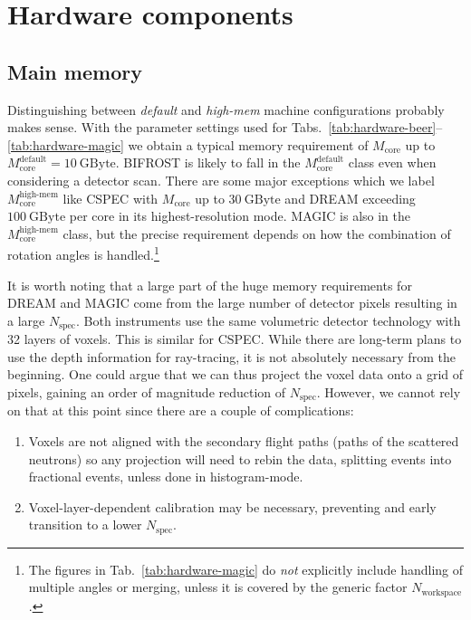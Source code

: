 \documentclass[a4paper,english,numbers=noenddot,bibliography=totoc,chapterprefix=on,DIV=12]{scrartcl}
\newcommand{\Nworkspace}{N_{\text{workspace}}}
\newcommand{\Nspec}{N_{\text{spec}}}
\newcommand{\Mcore}{M_{\text{core}}}
\newcommand{\bifrost}{BIFROST\xspace}
\newcommand{\cspec}{CSPEC\xspace}
\newcommand{\dream}{DREAM\xspace}
\newcommand{\magic}{MAGIC\xspace}
\begin{document}
\section{Hardware components}


\subsection{Main memory}

Distinguishing between \emph{default} and \emph{high-mem} machine configurations probably makes sense.
With the parameter settings used for Tabs.~\ref{tab:hardware-beer}--\ref{tab:hardware-magic} we obtain a typical memory requirement of $\Mcore$ up to $\Mcore^{\text{default}} = 10~\mathrm{GByte}$.
\bifrost is likely to fall in the $\Mcore^{\text{default}}$ class even when considering a detector scan.
There are some major exceptions which we label $\Mcore^{\text{high-mem}}$ like \cspec with $\Mcore$ up to $30~\mathrm{GByte}$ and \dream exceeding $100~\mathrm{GByte}$ per core in its highest-resolution mode.
\magic is also in the $\Mcore^{\text{high-mem}}$ class, but the precise requirement depends on how the combination of rotation angles is handled.\footnote{The figures in Tab.~\ref{tab:hardware-magic} do \emph{not} explicitly include handling of multiple angles or merging, unless it is covered by the generic factor $\Nworkspace$.}

It is worth noting that a large part of the huge memory requirements for \dream and \magic come from the large number of detector pixels resulting in a large $\Nspec$.
Both instruments use the same volumetric detector technology with 32 layers of voxels.
This is similar for \cspec.
While there are long-term plans to use the depth information for ray-tracing, it is not absolutely necessary from the beginning.
One could argue that we can thus project the voxel data onto a grid of pixels, gaining an order of magnitude reduction of $\Nspec$.
However, we cannot rely on that at this point since there are a couple of complications:
\begin{enumerate}
  \item Voxels are not aligned with the secondary flight paths (paths of the scattered neutrons) so any projection will need to rebin the data, splitting events into fractional events, unless done in histogram-mode.
  \item Voxel-layer-dependent calibration may be necessary, preventing and early transition to a lower $\Nspec$.
\end{enumerate}
\end{document}
